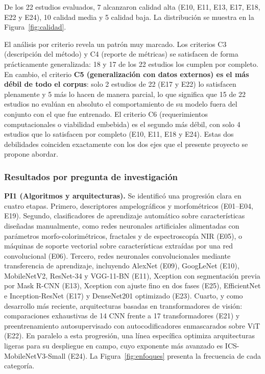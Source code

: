 De los 22 estudios evaluados, 7 alcanzaron calidad alta (E10, E11, E13, E17,
E18, E22 y E24), 10 calidad media y 5 calidad baja. La distribución se
muestra en la Figura~\ref{fig:calidad}.

El análisis por criterio revela un patrón muy marcado. Los criterios C3
(descripción del método) y C4 (reporte de métricas) se satisfacen de forma
prácticamente generalizada: 18 y 17 de los 22 estudios los cumplen por
completo. En cambio, el criterio \textbf{C5 (generalización con datos
externos) es el más débil de todo el corpus}: solo 2 estudios de 22 (E17 y
E22) lo satisfacen plenamente y 5 más lo hacen de manera parcial, lo que
significa que 15 de 22 estudios no evalúan en absoluto el comportamiento de
su modelo fuera del conjunto con el que fue entrenado. El criterio C6
(requerimientos computacionales o viabilidad embebida) es el segundo más
débil, con solo 4 estudios que lo satisfacen por completo (E10, E11, E18 y
E24). Estas dos debilidades coinciden exactamente con los dos ejes que el
presente proyecto se propone abordar.

\subsubsection{Resultados por pregunta de investigación}

\textbf{PI1 (Algoritmos y arquitecturas).} Se identificó una progresión clara
en cuatro etapas. Primero, descriptores ampelográficos y morfométricos
(E01--E04, E19). Segundo, clasificadores de aprendizaje automático sobre
características diseñadas manualmente, como redes neuronales artificiales
alimentadas con parámetros morfo-colorimétricos, fractales y de
espectroscopía NIR (E05), o máquinas de soporte vectorial sobre
características extraídas por una red convolucional (E06). Tercero, redes
neuronales convolucionales mediante transferencia de aprendizaje, incluyendo
AlexNet (E09), GoogLeNet (E10), MobileNetV2, ResNet-34 y VGG-11-BN (E11),
Xception con segmentación previa por Mask R-CNN (E13), Xception con ajuste
fino en dos fases (E25), EfficientNet e Inception-ResNet (E17) y DenseNet201
optimizado (E23). Cuarto, y como desarrollo más reciente, arquitecturas
basadas en transformadores de visión: comparaciones exhaustivas de 14 CNN
frente a 17 transformadores (E21) y preentrenamiento autosupervisado con
autocodificadores enmascarados sobre ViT (E22). En paralelo a esta
progresión, una línea específica optimiza arquitecturas ligeras para su
despliegue en campo, cuyo exponente más avanzado es ICS-MobileNetV3-Small
(E24). La Figura~\ref{fig:enfoques} presenta la frecuencia de cada categoría.

